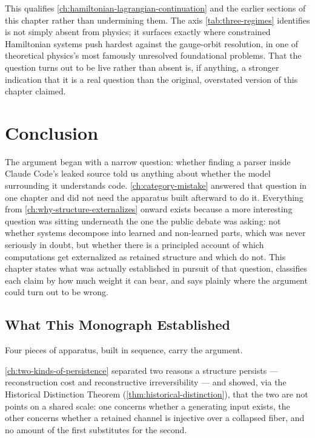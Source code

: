 \documentclass[11pt]{book}
\theoremstyle{plain}
\theoremstyle{definition}
\theoremstyle{remark}
\begin{document}
This qualifies \cref{ch:hamiltonian-lagrangian-continuation} and the
earlier sections of this chapter rather than undermining them. The
axis \cref{tab:three-regimes} identifies is not simply absent from
physics; it surfaces exactly where constrained Hamiltonian systems
push hardest against the gauge-orbit resolution, in one of theoretical
physics's most famously unresolved foundational problems. That the
question turns out to be live rather than absent is, if anything, a
stronger indication that it is a real question than the original,
overstated version of this chapter claimed.
\chapter{Conclusion}
\label{ch:conclusion}

The argument began with a narrow question: whether finding a parser
inside Claude Code's leaked source told us anything about whether the
model surrounding it understands code. \cref{ch:category-mistake}
answered that question in one chapter and did not need the apparatus
built afterward to do it. Everything from \cref{ch:why-structure-externalizes}
onward exists because a more interesting question was sitting
underneath the one the public debate was asking: not whether systems
decompose into learned and non-learned parts, which was never
seriously in doubt, but whether there is a principled account of which
computations get externalized as retained structure and which do not.
This chapter states what was actually established in pursuit of that
question, classifies each claim by how much weight it can bear, and
says plainly where the argument could turn out to be wrong.

\section{What This Monograph Established}

Four pieces of apparatus, built in sequence, carry the argument.

\cref{ch:two-kinds-of-persistence} separated two reasons a structure
persists --- reconstruction cost and reconstructive irreversibility ---
and showed, via the Historical Distinction Theorem
(\cref{thm:historical-distinction}), that the two are not points on a
shared scale: one concerns whether a generating input exists, the
other concerns whether a retained channel is injective over a
collapsed fiber, and no amount of the first substitutes for the
second.
\end{document}

